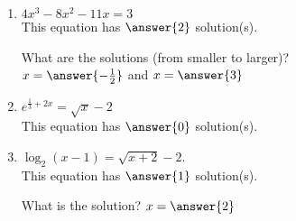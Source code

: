 \documentclass{ximera}
\begin{document}
\begin{exercise}
\begin{enumerate}
\item $4x^3-8x^2-11x=3$ \\
This equation has $\answer{2}$ solution(s).
\begin{exercise}
What are the solutions (from smaller to larger)?\\
$x=\answer{-\frac{1}{2}}$ and $x=\answer{3}$
\end{exercise}

\item $e^{\frac{1}{3} + 2x}=\sqrt{x}-2$ \\
This equation has $\answer{0}$ solution(s).

\item $\log_2(x-1) =\sqrt{x+2}-2$. \\
This equation has $\answer{1}$ solution(s).
\begin{exercise}
What is the solution?
$x=\answer{2}$
\end{exercise}


\end{enumerate}
\end{exercise}
\end{document}
